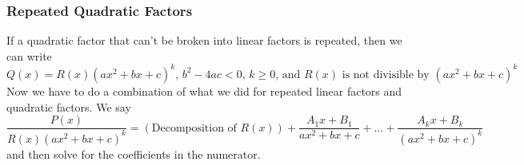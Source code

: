 \subsubsection{Repeated Quadratic Factors}
\noindent
If a quadratic factor that can't be broken into linear factors is repeated, then we can write
\begin{equation*}
	Q(x) = R(x)(ax^2+bx+c)^k\text{, }b^2-4ac < 0\text{, }k \geq 0\text{, and }R(x)\text{ is not divisible by }(ax^2+bx+c)^k
\end{equation*}
Now we have to do a combination of what we did for repeated linear factors and quadratic factors. We say
\begin{equation*}
	\frac{P(x)}{R(x)(ax^2+bx+c)^k}=\left(\text{Decomposition of }R(x)\right)+\frac{A_1x+B_1}{ax^2+bx+c}+\ldots+\frac{A_kx+B_k}{(ax^2+bx+c)^k}
\end{equation*}
and then solve for the coefficients in the numerator.

